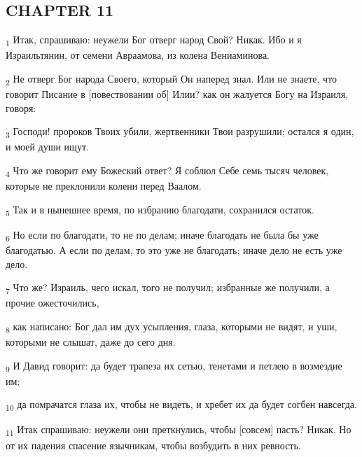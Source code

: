 \subsection{CHAPTER 11}
\begin{tcolorbox}
\textsubscript{1} Итак, спрашиваю: неужели Бог отверг народ Свой? Никак. Ибо и я Израильтянин, от семени Авраамова, из колена Вениаминова.
\end{tcolorbox}
\begin{tcolorbox}
\textsubscript{2} Не отверг Бог народа Своего, который Он наперед знал. Или не знаете, что говорит Писание в [повествовании об] Илии? как он жалуется Богу на Израиля, говоря:
\end{tcolorbox}
\begin{tcolorbox}
\textsubscript{3} Господи! пророков Твоих убили, жертвенники Твои разрушили; остался я один, и моей души ищут.
\end{tcolorbox}
\begin{tcolorbox}
\textsubscript{4} Что же говорит ему Божеский ответ? Я соблюл Себе семь тысяч человек, которые не преклонили колени перед Ваалом.
\end{tcolorbox}
\begin{tcolorbox}
\textsubscript{5} Так и в нынешнее время, по избранию благодати, сохранился остаток.
\end{tcolorbox}
\begin{tcolorbox}
\textsubscript{6} Но если по благодати, то не по делам; иначе благодать не была бы уже благодатью. А если по делам, то это уже не благодать; иначе дело не есть уже дело.
\end{tcolorbox}
\begin{tcolorbox}
\textsubscript{7} Что же? Израиль, чего искал, того не получил; избранные же получили, а прочие ожесточились,
\end{tcolorbox}
\begin{tcolorbox}
\textsubscript{8} как написано: Бог дал им дух усыпления, глаза, которыми не видят, и уши, которыми не слышат, даже до сего дня.
\end{tcolorbox}
\begin{tcolorbox}
\textsubscript{9} И Давид говорит: да будет трапеза их сетью, тенетами и петлею в возмездие им;
\end{tcolorbox}
\begin{tcolorbox}
\textsubscript{10} да помрачатся глаза их, чтобы не видеть, и хребет их да будет согбен навсегда.
\end{tcolorbox}
\begin{tcolorbox}
\textsubscript{11} Итак спрашиваю: неужели они преткнулись, чтобы [совсем] пасть? Никак. Но от их падения спасение язычникам, чтобы возбудить в них ревность.
\end{tcolorbox}
